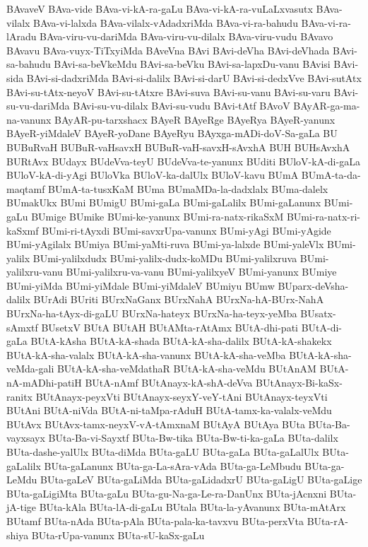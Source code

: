 {BAvaveV
BAva-vide
BAva-vi-kA-ra-gaLu
BAva-vi-kA-ra-vuLaLxvasutx
BAva-vilalx
BAva-vi-lalxda
BAva-vilalx-vAdadxriMda
BAva-vi-ra-bahudu
BAva-vi-ra-lAradu
BAva-viru-vu-dariMda
BAva-viru-vu-dilalx
BAva-viru-vudu
BAvavo
BAvavu
BAva-vuyx-TiTxyiMda
BAveVna
BAvi
BAvi-deVha
BAvi-deVhada
BAvi-sa-bahudu
BAvi-sa-beVkeMdu
BAvi-sa-beVku
BAvi-sa-lapxDu-vanu
BAvisi
BAvi-sida
BAvi-si-dadxriMda
BAvi-si-dalilx
BAvi-si-darU
BAvi-si-dedxVve
BAvi-sutAtx
BAvi-su-tAtx-neyoV
BAvi-su-tAtxre
BAvi-suva
BAvi-su-vanu
BAvi-su-varu
BAvi-su-vu-dariMda
BAvi-su-vu-dilalx
BAvi-su-vudu
BAvi-tAtf
BAvoV
BAyAR-ga-ma-na-vanunx
BAyAR-pu-tarxshacx
BAyeR
BAyeRge
BAyeRya
BAyeR-yanunx
BAyeR-yiMdaleV
BAyeR-yoDane
BAyeRyu
BAyxga-mADi-doV-Sa-gaLa
BU
BUBuRvaH
BUBuR-vaHsavxH
BUBuR-vaH-savxH-sAvxhA
BUH
BUHsAvxhA
BURtAvx
BUdayx
BUdeVva-teyU
BUdeVva-te-yanunx
BUditi
BUloV-kA-di-gaLa
BUloV-kA-di-yAgi
BUloVka
BUloV-ka-dalUlx
BUloV-kavu
BUmA
BUmA-ta-da-maqtamf
BUmA-ta-tusxKaM
BUma
BUmaMDa-la-dadxlalx
BUma-dalelx
BUmakUkx
BUmi
BUmigU
BUmi-gaLa
BUmi-gaLalilx
BUmi-gaLanunx
BUmi-gaLu
BUmige
BUmike
BUmi-ke-yanunx
BUmi-ra-natx-rikaSxM
BUmi-ra-natx-ri-kaSxmf
BUmi-ri-tAyxdi
BUmi-savxrUpa-vanunx
BUmi-yAgi
BUmi-yAgide
BUmi-yAgilalx
BUmiya
BUmi-yaMti-ruva
BUmi-ya-lalxde
BUmi-yaleVlx
BUmi-yalilx
BUmi-yalilxdudx
BUmi-yalilx-dudx-koMDu
BUmi-yalilxruva
BUmi-yalilxru-vanu
BUmi-yalilxru-va-vanu
BUmi-yalilxyeV
BUmi-yanunx
BUmiye
BUmi-yiMda
BUmi-yiMdale
BUmi-yiMdaleV
BUmiyu
BUmw
BUparx-deVsha-dalilx
BUrAdi
BUriti
BUrxNaGanx
BUrxNahA
BUrxNa-hA-BUrx-NahA
BUrxNa-ha-tAyx-di-gaLU
BUrxNa-hateyx
BUrxNa-ha-teyx-yeMba
BUsatx-sAmxtf
BUsetxV
BUtA
BUtAH
BUtAMta-rAtAmx
BUtA-dhi-pati
BUtA-di-gaLa
BUtA-kAsha
BUtA-kA-shada
BUtA-kA-sha-dalilx
BUtA-kA-shakekx
BUtA-kA-sha-valalx
BUtA-kA-sha-vanunx
BUtA-kA-sha-veMba
BUtA-kA-sha-veMda-gali
BUtA-kA-sha-veMdathaR
BUtA-kA-sha-veMdu
BUtAnAM
BUtA-nA-mADhi-patiH
BUtA-nAmf
BUtAnayx-kA-shA-deVva
BUtAnayx-Bi-kaSx-ranitx
BUtAnayx-peyxVti
BUtAnayx-seyxY-veY-tAni
BUtAnayx-teyxVti
BUtAni
BUtA-niVda
BUtA-ni-taMpa-rAduH
BUtA-tamx-ka-valalx-veMdu
BUtAvx
BUtAvx-tamx-neyxV-vA-tAmxnaM
BUtAyA
BUtAya
BUta
BUta-Ba-vayxsayx
BUta-Ba-vi-Sayxtf
BUta-Bw-tika
BUta-Bw-ti-ka-gaLa
BUta-dalilx
BUta-dashe-yalUlx
BUta-diMda
BUta-gaLU
BUta-gaLa
BUta-gaLalUlx
BUta-gaLalilx
BUta-gaLanunx
BUta-ga-La-sAra-vAda
BUta-ga-LeMbudu
BUta-ga-LeMdu
BUta-gaLeV
BUta-gaLiMda
BUta-gaLidadxrU
BUta-gaLigU
BUta-gaLige
BUta-gaLigiMta
BUta-gaLu
BUta-gu-Na-ga-Le-ra-DanUnx
BUta-jAcnxni
BUta-jA-tige
BUta-kAla
BUta-lA-di-gaLu
BUtala
BUta-la-yAvanunx
BUta-mAtArx
BUtamf
BUta-nAda
BUta-pAla
BUta-pala-ka-tavxvu
BUta-perxVta
BUta-rA-shiya
BUta-rUpa-vanunx
BUta-sU-kaSx-gaLu
}
